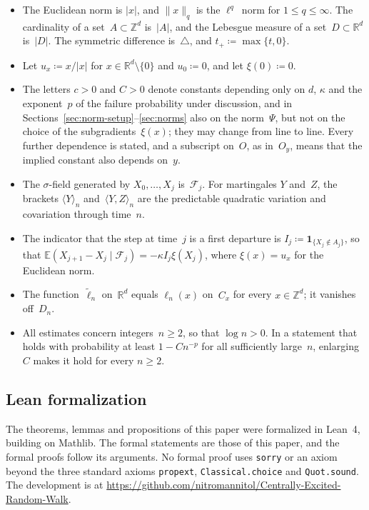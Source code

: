 \documentclass[11pt]{amsart}
\theoremstyle{plain}
\theoremstyle{definition}
\newcommand{\Z}{\mathbb Z}
\newcommand{\R}{\mathbb R}
\newcommand{\E}{\mathbb E}
\newcommand{\drift}{\kappa}
\newcommand{\gauge}{\Psi}
\newcommand{\ind}{\mathbf 1}
\numberwithin{equation}{section}
\begin{document}
\begin{itemize}
\item The Euclidean norm is $|x|$, and $\|x\|_q$ is the $\ell^q$~norm for $1\leq q\leq\infty$. The cardinality of a set~$A\subset\Z^d$ is~$|A|$, and the Lebesgue measure of a set~$D\subset\R^d$ is~$|D|$. The symmetric difference is~$\triangle$, and $t_+\coloneqq\max\{t,0\}$.
\item Let $u_x\coloneqq x/|x|$ for $x\in\R^d\setminus\{0\}$ and $u_0\coloneqq0$, and let $\xi(0)\coloneqq0$.
\item The letters $c>0$ and $C>0$ denote constants depending only on $d$, $\drift$ and the exponent~$p$ of the failure probability under discussion, and in Sections~\ref{sec:norm-setup}--\ref{sec:norms} also on the norm~$\gauge$, but not on the choice of the subgradients~$\xi(x)$; they may change from line to line. Every further dependence is stated, and a subscript on~$O$, as in~$O_y$, means that the implied constant also depends on~$y$.
\item The $\sigma$-field generated by $X_0,\ldots,X_j$ is~$\mathcal F_j$. For martingales $Y$ and~$Z$, the brackets $\langle Y\rangle_n$ and~$\langle Y,Z\rangle_n$ are the predictable quadratic variation and covariation through time~$n$.
\item The indicator that the step at time~$j$ is a first departure is $I_j\coloneqq\ind_{\{X_j\notin A_j\}}$, so that $\E(X_{j+1}-X_j\mid\mathcal F_j)=-\drift I_j\xi(X_j)$, where $\xi(x)=u_x$ for the Euclidean norm.
\item The function~$\widetilde\ell_n$ on~$\R^d$ equals $\ell_n(x)$ on~$C_x$ for every $x\in\Z^d$; it vanishes off~$D_n$.
\item All estimates concern integers~$n\geq2$, so that $\log n>0$. In a statement that holds with probability at least $1-Cn^{-p}$ for all sufficiently large~$n$, enlarging~$C$ makes it hold for every $n\geq2$.
\end{itemize}

\subsection{Lean formalization}\label{ssec:formalization}
The theorems, lemmas and propositions of this paper were formalized in Lean~4, building on Mathlib. The formal statements are those of this paper, and the formal proofs follow its arguments. No formal proof uses \texttt{sorry} or an axiom beyond the three standard axioms \texttt{propext}, \texttt{Classical.choice} and \texttt{Quot.sound}. The development is at \url{https://github.com/nitromannitol/Centrally-Excited-Random-Walk}.
\end{document}
